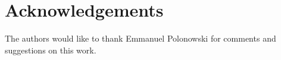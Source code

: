 \section*{Acknowledgements}
The authors would like to thank Emmanuel Polonowski for comments and 
suggestions on this work.

